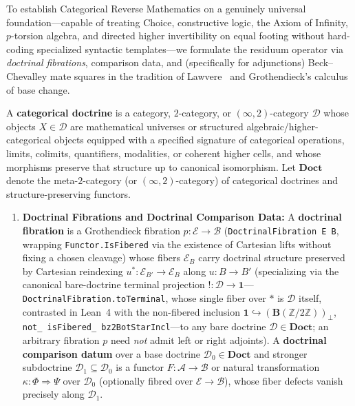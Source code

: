 To establish Categorical Reverse Mathematics on a genuinely universal foundation---capable of treating Choice, constructive logic, the Axiom of Infinity, $p$-torsion algebra, and directed higher invertibility on equal footing without hard-coding specialized syntactic templates---we formulate the residuum operator via \emph{doctrinal fibrations}, comparison data, and (specifically for adjunctions) Beck--Chevalley mate squares in the tradition of Lawvere~\cite{Lawvere69,Maietti05,Johnstone02} and Grothendieck's calculus of base change.

\begin{definition}\label{def:comparison-triple}%
%
A \textbf{categorical doctrine} is a category, $2$-category, or $(\infty, 2)$-category $\mathcal{D}$ whose objects $X \in \mathcal{D}$ are mathematical universes or structured algebraic/higher-categorical objects equipped with a specified signature of categorical operations, limits, colimits, quantifiers, modalities, or coherent higher cells, and whose morphisms preserve that structure up to canonical isomorphism. Let $\mathbf{Doct}$ denote the meta-$2$-category (or $(\infty, 2)$-category) of categorical doctrines and structure-preserving functors.
\begin{enumerate}
  \item \textbf{Doctrinal Fibrations and Doctrinal Comparison Data:} A \textbf{doctrinal fibration} is a Grothendieck fibration $p : \mathcal{E} \to \mathcal{B}$ (\texttt{DoctrinalFibration E B}, wrapping \texttt{Functor.IsFibered} via the existence of Cartesian lifts without fixing a chosen cleavage) whose fibers $\mathcal{E}_B$ carry doctrinal structure preserved by Cartesian reindexing $u^* : \mathcal{E}_{B'} \to \mathcal{E}_B$ along $u : B \to B'$ (specializing via the canonical bare-doctrine terminal projection $! : \mathcal{D} \to \mathbf{1}$---\texttt{DoctrinalFibration.toTerminal}, whose single fiber over $*$ is $\mathcal{D}$ itself, contrasted in Lean~4 with the non-fibered inclusion $\mathbf{1} \hookrightarrow (\mathbf{B}(\mathbb{Z}/2\mathbb{Z}))_\bot$, \texttt{not\_ isFibered\_ bz2BotStarIncl}---to any bare doctrine $\mathcal{D} \in \mathbf{Doct}$; an arbitrary fibration $p$ need \emph{not} admit left or right adjoints). A \textbf{doctrinal comparison datum} over a base doctrine $\mathcal{D}_0 \in \mathbf{Doct}$ and stronger subdoctrine $\mathcal{D}_1 \subseteq \mathcal{D}_0$ is a functor $F : \mathcal{A} \to \mathcal{B}$ or natural transformation $\kappa : \Phi \Rightarrow \Psi$ over $\mathcal{D}_0$ (optionally fibred over $\mathcal{E} \to \mathcal{B}$), whose fiber defects vanish precisely along $\mathcal{D}_1$.

\end{enumerate}
\end{definition}
